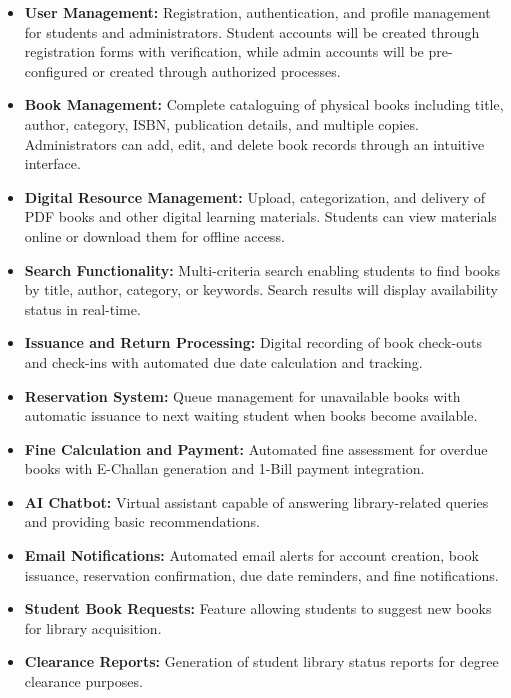 \documentclass[12pt,a4paper]{report}
\begin{document}
\begin{itemize}
    \item \textbf{User Management:} Registration, authentication, and profile management for students and administrators. Student accounts will be created through registration forms with verification, while admin accounts will be pre-configured or created through authorized processes.
    
\newpage    
    
    \item \textbf{Book Management:} Complete cataloguing of physical books including title, author, category, ISBN, publication details, and multiple copies. Administrators can add, edit, and delete book records through an intuitive interface.
    
    \item \textbf{Digital Resource Management:} Upload, categorization, and delivery of PDF books and other digital learning materials. Students can view materials online or download them for offline access.
    
    \item \textbf{Search Functionality:} Multi-criteria search enabling students to find books by title, author, category, or keywords. Search results will display availability status in real-time.

    \item \textbf{Issuance and Return Processing:} Digital recording of book check-outs and check-ins with automated due date calculation and tracking.
    
    \item \textbf{Reservation System:} Queue management for unavailable books with automatic issuance to next waiting student when books become available.
    
    \item \textbf{Fine Calculation and Payment:} Automated fine assessment for overdue books with E-Challan generation and 1-Bill payment integration.
    
    \item \textbf{AI Chatbot:} Virtual assistant capable of answering library-related queries and providing basic recommendations.
    
    \item \textbf{Email Notifications:} Automated email alerts for account creation, book issuance, reservation confirmation, due date reminders, and fine notifications.
    
    \item \textbf{Student Book Requests:} Feature allowing students to suggest new books for library acquisition.
    
    \item \textbf{Clearance Reports:} Generation of student library status reports for degree clearance purposes.
\end{itemize}
\end{document}
